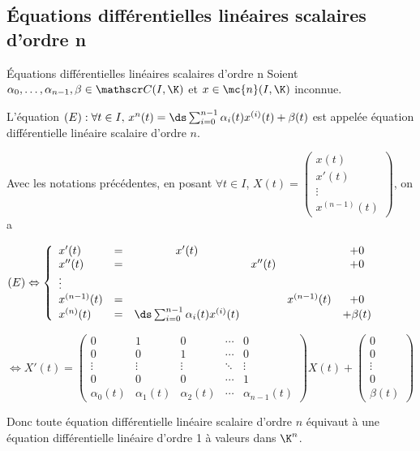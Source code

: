 \subsection{\'Equations différentielles linéaires scalaires d'ordre n}

\begin{definition}{\'Equations différentielles linéaires scalaires d'ordre n}{}
    Soient $\alpha_0, \dots, \alpha_{n-1}, \beta \in \mathscr C(I, \K)$ et 
    $x \in \mc{n} (I, \K)$ inconnue. 

    L'équation $(E) : \forall t \in I, \, x^n(t) = \ds \sum_{i = 0}^{n - 1} \alpha_i(t) x^{(i)}(t) + \beta(t)$ est 
    appelée équation différentielle linéaire scalaire d'ordre $n$.
\end{definition}

\begin{proposition}{}{}
    Avec les notations précédentes, en posant $\forall t \in I$, 
    $X(t) = \begin{pmatrix}
        x(t) \\ x'(t) \\ \vdots \\ x^{(n-1)}(t)
    \end{pmatrix}$, on a 

    $(E) \Leftrightarrow \left\{ \begin{array}{lccccc}
        x'(t) & = & x'(t) & & & + 0 \\
        x''(t) & = & & x''(t) & & + 0 \\
        \vdots & & & & & \\
        x^{(n-1)}(t) & = &  & & x^{(n-1)}(t) & + 0 \\
        x^{(n)}(t) & = & \ds \sum_{i = 0}^{n - 1} \alpha_i(t) x^{(i)}(t) & & & + \beta(t) 
    \end{array} \right.$

    $\Leftrightarrow X'(t) = \begin{pmatrix}
        0 & 1 & 0 & \cdots & 0 \\
        0 & 0 & 1 & \cdots & 0 \\
        \vdots & \vdots & \vdots & \ddots & \vdots \\
        0 & 0 & 0 & \cdots & 1 \\
        \alpha_0(t) & \alpha_1(t) & \alpha_2(t) & \cdots & \alpha_{n-1}(t)
     \end{pmatrix} X(t) + \begin{pmatrix}
        0 \\ 0 \\ \vdots \\ 0 \\ \beta(t)
    \end{pmatrix}$

    \svspace Donc toute équation différentielle linéaire scalaire d'ordre $n$ équivaut à une équation différentielle 
    linéaire d'ordre 1 à valeurs dans $\K^n$.
\end{proposition}

